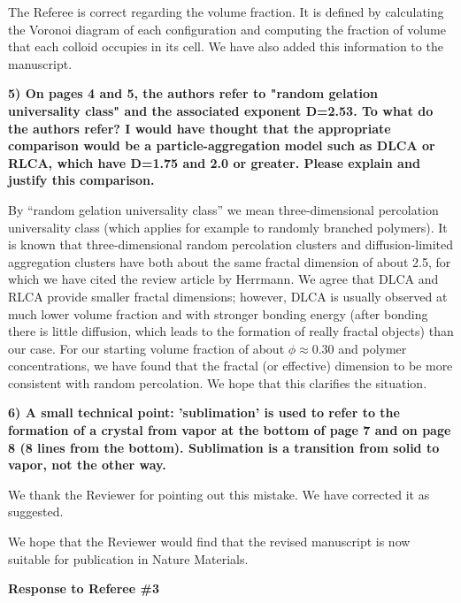 \documentclass[11pt,a4paper]{article}
\newenvironment{referee}%
{\bigskip\singlespacing\bf}%
{\par\bigskip}
\begin{document}
The Referee is correct regarding the volume fraction. It is defined by calculating the Voronoi diagram of each configuration
and computing the fraction of volume that each colloid occupies in its cell. We have also added this information to
the manuscript.


\begin{referee}
5) On pages 4 and 5, the authors refer to "random gelation universality class" and the associated exponent D=2.53. To what do the authors refer? I would have thought that the appropriate comparison would be a particle-aggregation model such as DLCA or RLCA, which have D=1.75 and 2.0 or greater. Please explain and justify this comparison.
\end{referee}

By ``random gelation universality class'' we mean three-dimensional percolation universality class (which applies for example to randomly branched polymers).
It is known that three-dimensional random percolation clusters and diffusion-limited aggregation clusters have both about the same fractal dimension of about 2.5, for which we have cited the review article by Herrmann. We agree that DLCA and RLCA provide smaller fractal dimensions; however, DLCA is usually observed at much lower volume fraction and with stronger bonding energy (after bonding there is little diffusion, which leads to the formation of really fractal objects) than our case. For our starting volume fraction of about $\phi\approx 0.30$ and polymer concentrations, we have found that the fractal (or effective) dimension to be more consistent with random percolation. We hope that this clarifies the situation.


\begin{referee}
6) A small technical point: 'sublimation' is used to refer to the formation of a crystal from vapor at the bottom of page 7 and on page 8 (8 lines from the bottom). Sublimation is a transition from solid to vapor, not the other way.
\end{referee}

We thank the Reviewer for pointing out this mistake. We have corrected it as suggested. 

\vspace{1cm}

We hope that the Reviewer would find that the revised manuscript is now suitable for publication in Nature Materials. 


\clearpage

\noindent
\begin{Large}
{\bf Response to Referee \#3}
\end{Large}
\end{document}
